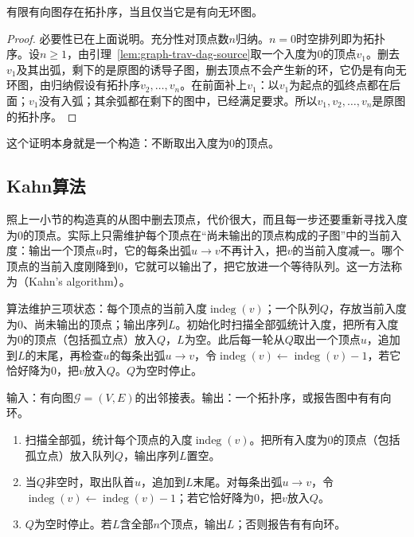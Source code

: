 \begin{theorem}[拓扑序的存在性]
\label{thm:graph-trav-topological-existence}
有限有向图存在拓扑序，当且仅当它是有向无环图。
\end{theorem}

\begin{proof}
必要性已在上面说明。充分性对顶点数$n$归纳。$n=0$时空排列即为拓扑序。设$n\geq1$，由引理~\ref{lem:graph-trav-dag-source}取一个入度为$0$的顶点$v_1$。删去$v_1$及其出弧，剩下的是原图的诱导子图，删去顶点不会产生新的环，它仍是有向无环图，由归纳假设有拓扑序$v_2,\ldots,v_n$。在前面补上$v_1$：以$v_1$为起点的弧终点都在后面；$v_1$没有入弧；其余弧都在剩下的图中，已经满足要求。所以$v_1,v_2,\ldots,v_n$是原图的拓扑序。
\end{proof}

这个证明本身就是一个构造：不断取出入度为$0$的顶点。

\subsection{Kahn算法}
\label{sec:graph-trav-kahn}

照上一小节的构造真的从图中删去顶点，代价很大，而且每一步还要重新寻找入度为$0$的顶点。实际上只需维护每个顶点在“尚未输出的顶点构成的子图”中的当前入度：输出一个顶点$u$时，它的每条出弧$u\to v$不再计入，把$v$的当前入度减一。哪个顶点的当前入度刚降到$0$，它就可以输出了，把它放进一个等待队列。这一方法称为（Kahn's algorithm）。

算法维护三项状态：每个顶点的当前入度$\operatorname{indeg}(v)$；一个队列$Q$，存放当前入度为$0$、尚未输出的顶点；输出序列$L$。初始化时扫描全部弧统计入度，把所有入度为$0$的顶点（包括孤立点）放入$Q$，$L$为空。此后每一轮从$Q$取出一个顶点$u$，追加到$L$的末尾，再检查$u$的每条出弧$u\to v$，令$\operatorname{indeg}(v)\gets\operatorname{indeg}(v)-1$，若它恰好降为$0$，把$v$放入$Q$。$Q$为空时停止。

\begin{algorithm}[Kahn拓扑排序]
\label{alg:graph-trav-kahn}
输入：有向图$\mathcal G=(V,E)$的出邻接表。输出：一个拓扑序，或报告图中有有向环。
\begin{enumerate}
  \item 扫描全部弧，统计每个顶点的入度$\operatorname{indeg}(v)$。把所有入度为$0$的顶点（包括孤立点）放入队列$Q$，输出序列$L$置空。
  \item 当$Q$非空时，取出队首$u$，追加到$L$末尾。对每条出弧$u\to v$，令$\operatorname{indeg}(v)\gets\operatorname{indeg}(v)-1$；若它恰好降为$0$，把$v$放入$Q$。
  \item $Q$为空时停止。若$L$含全部$n$个顶点，输出$L$；否则报告有有向环。
\end{enumerate}
\end{algorithm}

